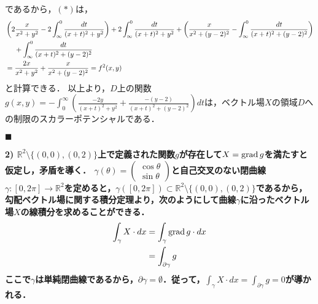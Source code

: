 \documentclass[dvipdfmx,a4paper,uplatex]{jsarticle}
\begin{document}
であるから，$(\ast)$は，
\begin{align*}
    &\left( 2\frac{x}{x^2+y^2}-2\int^0_\infty\frac{dt}{(x+t)^2+y^2} \right) + 2\int^0_\infty\frac{dt}{(x+t)^2+y^2}+\left( \frac{x}{x^2+(y-2)^2} - \int^0_\infty\frac{dt}{(x+t)^2+(y-2)^2} \right)\\*
    &\hphantom{{}={}}+ \int^0_\infty\frac{dt}{(x+t)^2+(y-2)^2} \\
    &= \frac{2x}{x^2+y^2}+\frac{x}{x^2+(y-2)^2}=f^2(x,y)
\end{align*}
と計算できる．
以上より，$D$上の関数$g(x,y)=-\int^\infty_0 \left( \frac{-2y}{(x+t)^2+y^2} + \frac{-(y-2)}{(x+t)^2+(y-2)^2} \right)dt$は，ベクトル場$X$の領域$D$への制限のスカラーポテンシャルである．
\begin{flushright}
    $\blacksquare$
\end{flushright}





\bf{2)} $\mathbb{R}^2\setminus\{(0,0),(0,2)\}$上で定義された関数$g$が存在して$X=\operatorname{\mathrm{grad}} g$を満たすと仮定し，矛盾を導く．
$\gamma(\theta)=\begin{pmatrix}\cos\theta\\\sin\theta\end{pmatrix}$と自己交叉のない閉曲線$\gamma:[0,2\pi]\to \mathbb{R}^2$を定めると，$\gamma([0,2\pi])\subset\mathbb{R}^2\setminus\{(0,0),(0,2)\}$であるから，勾配ベクトル場に関する積分定理より，次のようにして曲線$\gamma$に沿ったベクトル場$X$の線積分を求めることができる．
\begin{align*}
    \int_\gamma X\cdot dx &= \int_\gamma\operatorname{\mathrm{grad}} g\cdot dx \\
    &= \int_{\partial\gamma}g
\end{align*}
ここで$\gamma$は単純閉曲線であるから，$\partial\gamma=\emptyset$．従って，$\int_\gamma X\cdot dx=\int_{\partial\gamma}g=0$が導かれる．
\end{document}
